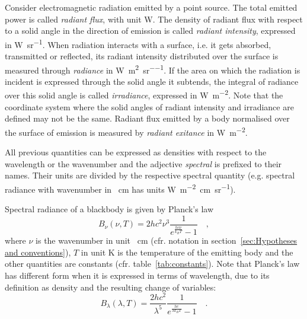 \documentclass[a4paper,10pt,twocolumn,\classoptions]{article}
\begin{document}
Consider electromagnetic radiation emitted by a point source. The total emitted power is called \emph{radiant flux}, with unit \unit{\watt}. The density of radiant flux with respect to a solid angle in the direction of emission is called \emph{radiant intensity}, expressed in \unit{\watt\per\steradian}. When radiation interacts with a surface, i.e. it gets absorbed, transmitted or reflected, its radiant intensity distributed over the surface is measured through \emph{radiance} in \unit{\watt\per\square\metre\per\steradian}. If the area on which the radiation is incident is expressed through the solid angle it subtends, the integral of radiance over this solid angle is called \emph{irradiance}, expressed in \unit{\watt\per\square\metre}. Note that the coordinate system where the solid angles of radiant intensity and irradiance are defined may not be the same. Radiant flux emitted by a body normalised over the surface of emission is measured by \emph{radiant exitance} in \unit{\watt\per\square\metre}.


All previous quantities can be expressed as densities with respect to the wavelength or the wavenumber and the adjective \emph{spectral} is prefixed to their names. Their units are divided by the respective spectral quantity (e.g. spectral radiance with wavenumber in \unit{\per\centi\metre} has units \unit{\watt\per\metre\squared\centi\metre\per\steradian}).

Spectral radiance of a blackbody is given by Planck's law
\begin{equation}
  \label{eq:spectral_radiance_blackbody}
  B_\nu (\nu, T) = 2 h c^2 \nu^3 \frac{1}{e^\frac{h c \nu}{k_B T} - 1}
  \quad ,
\end{equation}
where $\nu$ is the wavenumber in unit \unit{\per\centi\metre} (cfr. notation in section~\ref{sec:Hypotheses and conventions}), $T$ in unit \unit{\kelvin} is the temperature of the emitting body and the other quantities are constants (cfr. table~\ref{tab:constants}).
Note that Planck's law has different form when it is expressed in terms of wavelength, due to its definition as density and the resulting change of variables:
\begin{equation}
  \label{eq:spectral_radiance_blackbody_lambda}
  B_\lambda (\lambda, T) = \frac{2 h c^2}{\lambda^5} \frac{1}{e^\frac{h c}{\lambda k_B T} - 1}
  \quad .
\end{equation}
\end{document}
